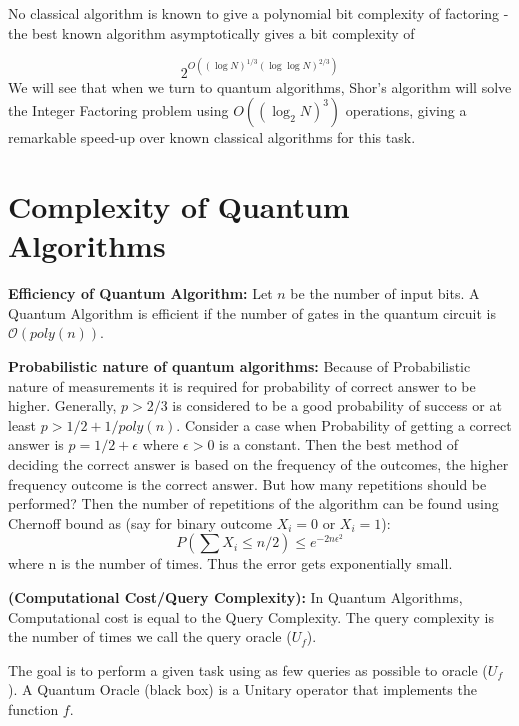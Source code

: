 No classical algorithm is known to give a polynomial bit complexity of factoring - the best known algorithm asymptotically gives a bit complexity of

\[
2^{O((\log N)^{1/3}(\log \log N)^{2/3})}
\]
We will see that when we turn to quantum algorithms, Shor's algorithm will solve the Integer Factoring problem using $O((\log_2N)^3)$ operations, giving a remarkable speed-up over known classical algorithms for this task.


\section{Complexity of Quantum Algorithms}
\begin{definition}
    \textbf{Efficiency of Quantum Algorithm: } Let $n$ be the number of input bits. A Quantum Algorithm is efficient if the number of gates in the quantum circuit is $\mathcal{O}(poly(n))$.
\end{definition} 

\begin{definition}
    \textbf{Probabilistic nature of quantum algorithms:} Because of Probabilistic nature of measurements it is required for probability of correct answer to be higher. Generally, $p>2/3$ is considered to be a good probability of success or at least $p>1/2 + 1/poly(n)$. Consider a case when Probability of getting a correct answer is $p=1/2+\epsilon$ where $\epsilon>0$ is a constant. Then the best method of deciding the correct answer is based on the frequency of the outcomes, the higher frequency outcome is the correct answer. But how many repetitions should be performed? Then the number of repetitions of the algorithm can be found using Chernoff bound as (say for binary outcome $X_i=0$ or $X_i=1$):
\[P(\sum X_i \leq n/2) \leq e^{-2n\epsilon^2}\] 
where n is the number of times. Thus the error gets exponentially small.
\end{definition}

\begin{definition}
    \textbf{(Computational Cost/Query Complexity):}
    In Quantum Algorithms, Computational cost is equal to the Query Complexity. The query complexity is the number of times we call the query oracle ($U_f$).
\end{definition}
The goal is to perform a given task using as few queries as possible to oracle ($U_f$). A Quantum Oracle (black box) is a Unitary operator that implements the function $f$.

